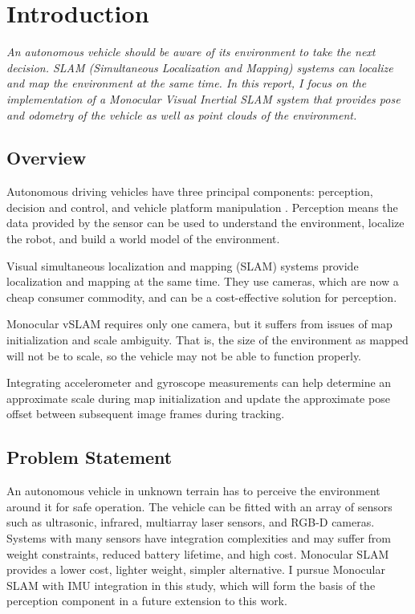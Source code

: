\setlength{\footskip}{8mm}

\chapter{Introduction}

\textit{An autonomous vehicle should be aware of its environment to take the next decision. SLAM (Simultaneous Localization and Mapping) systems can localize and map the environment at the same time. In this report, I focus on the implementation of a Monocular Visual Inertial SLAM system that provides pose and odometry of the vehicle as well as point clouds of the environment.}

\section{Overview}

Autonomous driving vehicles have three principal components: perception, decision and control, and vehicle platform manipulation . Perception means the data provided by the sensor can be used to understand the environment, localize the robot, and build a world model of the environment.

Visual simultaneous localization and mapping (SLAM) systems provide localization and mapping at the same time. They use cameras, which are now a cheap consumer commodity, and can be a cost-effective solution for perception.

Monocular vSLAM requires only one camera, but it suffers from issues of map initialization and scale ambiguity. That is, the size of the environment as mapped will not be to scale, so the vehicle may not be able to function properly.

Integrating accelerometer and gyroscope measurements can help determine an approximate scale during map initialization and update the approximate pose offset between subsequent image frames during tracking.


\section{Problem Statement}

An autonomous vehicle in unknown terrain has to perceive the environment around it for safe operation. The vehicle can be fitted with an array of sensors such as ultrasonic, infrared, multiarray laser sensors, and RGB-D cameras. Systems with many sensors have integration complexities and may suffer from weight constraints, reduced battery lifetime, and high cost. Monocular SLAM provides a lower cost, lighter weight, simpler alternative. I pursue Monocular SLAM with IMU integration in this study, which will form the basis of the perception component in a future extension to this work.


